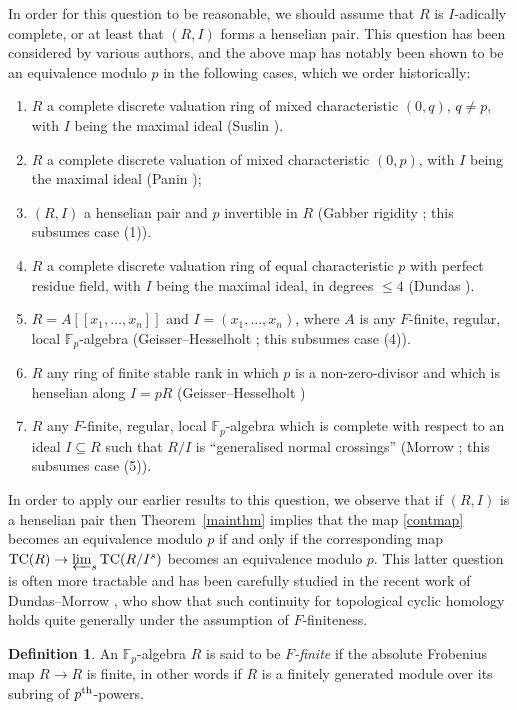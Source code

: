 \documentclass{amsart}
\theoremstyle{definition}
\newtheorem{definition}{Definition}[section]
\newcommand{\bb}{\mathbb}
\newcommand{\sub}[1]{{\mbox{\rm \scriptsize #1}}}
\newcommand{\TC}{\mathrm{TC}}
\begin{document}
In order for this question to be reasonable, we should assume that $R$ is
$I$-adically complete, or at least that $(R, I)$ forms a henselian pair. This question has been considered by various authors, and the above map has notably been shown to be an equivalence modulo $p$ in the following cases, which we order historically:
\begin{enumerate}
\item $R$ a complete discrete valuation ring of mixed characteristic $(0,q)$, $q\neq p$, with $I$ being the maximal ideal (Suslin \cite{Suslinlocal}).
\item $R$ a complete discrete valuation of mixed characteristic $(0,p)$, with $I$ being the maximal ideal (Panin \cite{Panin});
\item $(R,I)$ a henselian pair and $p$ invertible in $R$ (Gabber rigidity \cite{gabber}; this subsumes case (1)).
\item $R$ a complete discrete valuation ring of equal characteristic $p$ with
perfect residue field, with $I$ being the maximal ideal, in degrees $\leq 4$
(Dundas \cite{Dundascont}).
\item $R=A[[x_1,\dots,x_n]]$ and $I=(x_1,\dots,x_n)$, where $A$ is any $F$-finite, regular, local $\bb F_p$-algebra (Geisser--Hesselholt \cite{GHcomplete}; this subsumes case (4)).
\item $R$ any ring of finite stable rank in which $p$ is a non-zero-divisor and which is henselian along $I=pR$ (Geisser--Hesselholt \cite{GHlocal})
\item $R$ any $F$-finite, regular, local $\bb F_p$-algebra which is complete with respect to an ideal $I\subseteq R$ such that $R/I$ is ``generalised normal crossings'' (Morrow \cite{Morrow-HW}; this subsumes case (5)).
\end{enumerate}

In order to apply our earlier results to this question, we observe that if $(R, I)$ is a henselian pair  then Theorem~\ref{mainthm} implies that 
the map \eqref{contmap} becomes an equivalence modulo $p$ if and only if the
corresponding map $\TC(R) \to \varprojlim_s \TC(R/I^s)$ becomes an equivalence
modulo $p$. 
This latter question is often more tractable and has been carefully
studied in the recent work of Dundas--Morrow \cite{DundasMorrow}, who show that such
continuity for topological cyclic homology holds quite generally under the assumption of
$F$-finiteness. 

\begin{definition} 
\label{Ffinite}
An $\mathbb{F}_p$-algebra $R$ is said to be \emph{$F$-finite} if the absolute Frobenius
map $R \to R$ is finite, in other words if $R$ is a finitely generated module over its subring of $p^\sub{th}$-powers.
\end{definition} 
\end{document}
